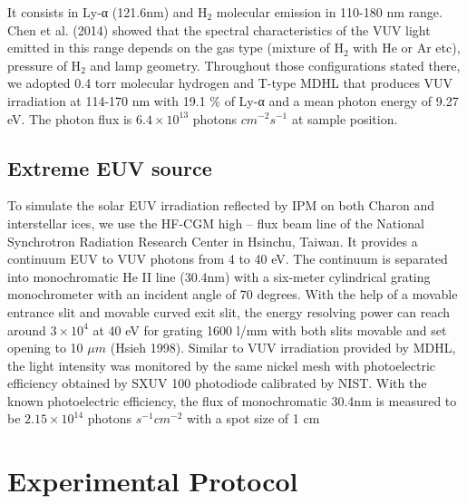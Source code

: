It consists in Ly-α (121.6nm) and H$_2$ molecular emission in 110-180 nm range. Chen et al. (2014) showed that the spectral characteristics of the VUV light emitted in this range depends on the gas type (mixture of H$_2$ with He or Ar etc), pressure of H$_2$ and lamp geometry. Throughout those configurations stated there, we adopted 0.4 torr molecular hydrogen and T-type MDHL that produces VUV irradiation at 114-170 nm with 19.1 \% of Ly-α and a mean photon energy of 9.27 eV. The photon flux is $6.4 \times 10^{13}$ photons $cm^{-2} s^{-1}$ at sample position.

\subsection{Extreme EUV source}
\label{sec:Extreme_EUV_source}

To simulate the solar EUV irradiation reflected by IPM on both Charon and interstellar ices, we use the HF-CGM high – flux beam line of the National Synchrotron Radiation Research Center in Hsinchu, Taiwan. It provides a continuum EUV to VUV photons from 4 to 40 eV. The continuum is separated into monochromatic He II line (30.4nm) with a six-meter cylindrical grating monochrometer with an incident angle of 70 degrees. With the help of a movable entrance slit and movable curved exit slit, the energy resolving power can reach around $3 \times 10^4$ at 40 eV for grating 1600 l/mm with both slits movable and set opening to 10 $\mu m$ (Hsieh 1998). Similar to VUV irradiation provided by MDHL, the light intensity was monitored by the same nickel mesh with photoelectric efficiency obtained by SXUV 100 photodiode calibrated by NIST. With the known photoelectric efficiency, the flux of monochromatic 30.4nm is measured to be $2.15 \times 10^{14}$ photons $s^{-1} cm^{-2}$ with a spot size of 1 cm%

\section{Experimental Protocol}
\label{sec:Experimental_Protocol}


